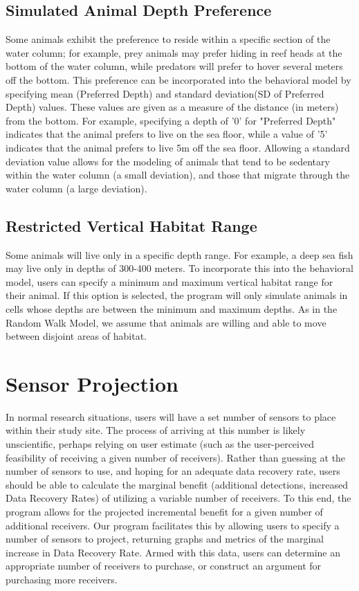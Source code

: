 \subsection{Simulated Animal Depth Preference}
Some animals exhibit the preference to reside within a specific section of the water column; for example, prey animals may prefer hiding in reef heads at the bottom of the water column, while predators will prefer to hover several meters off the bottom.  This preference can be incorporated into the behavioral model by specifying mean (Preferred Depth) and standard deviation(SD of Preferred Depth) values.  These values are given as a measure of the distance (in meters) from the bottom.  For example, specifying a depth of '0' for "Preferred Depth" indicates that the animal prefers to live on the sea floor, while a value of '5' indicates that the animal prefers to live 5m off the sea floor.  Allowing a standard deviation value allows for the modeling of animals that tend to be sedentary within the water column (a small deviation), and those that migrate through the water column (a large deviation).

\subsection{Restricted Vertical Habitat Range}
Some animals will live only in a specific depth range.  For example, a deep sea fish may live only in depths of 300-400 meters.  To incorporate this into the behavioral model, users can specify a minimum and maximum vertical habitat range for their animal.  If this option is selected, the program will only simulate animals in cells whose depths are between the minimum and maximum depths.  As in the Random Walk Model, we assume that animals are willing and able to move between disjoint areas of habitat.


\section{Sensor Projection}
In normal research situations, users will have a set number of sensors to place within their study site.  The process of arriving at this number is likely unscientific, perhaps relying on user estimate (such as the user-perceived feasibility of receiving a given number of receivers).  Rather than guessing at the number of sensors to use, and hoping for an adequate data recovery rate, users should be able to calculate the marginal benefit (additional detections, increased Data Recovery Rates) of utilizing a variable number of receivers.   To this end, the program allows for the projected incremental benefit for a given number of additional receivers.  Our program facilitates this by allowing users to specify a number of sensors to project, returning graphs and metrics of the marginal increase in Data Recovery Rate.  Armed with this data, users can determine an appropriate number of receivers to purchase, or construct an argument for purchasing more receivers.

